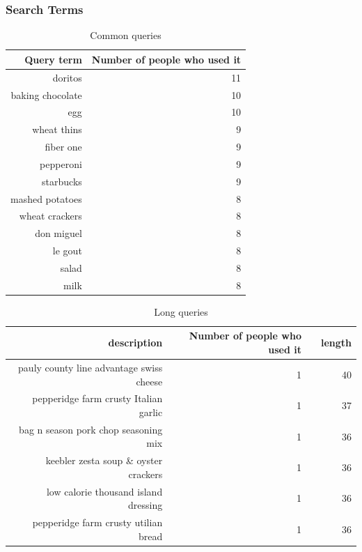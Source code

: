 \subsubsection{Search Terms}
\begin{table}[bthp]
\small
  \centering
  \caption{Common queries}
    \begin{tabular}{rr}
    \toprule
    Query term & Number of people who used it \\
    \midrule
    doritos & 11 \\
    baking chocolate & 10 \\
    egg   & 10 \\
    wheat thins & 9 \\
    fiber one & 9 \\
    pepperoni & 9 \\
    starbucks & 9 \\
    mashed potatoes & 8 \\
    wheat crackers & 8 \\
    don miguel & 8 \\
    le gout & 8 \\
    salad & 8 \\
    milk  & 8 \\
    \bottomrule
    \end{tabular}%
  \label{tab:inlab_commonqueries}%
\end{table}%


\begin{table}[htbp]
\small
  \centering
    \begin{tabular}{rrrr}
    \toprule
    description & Number of people who used it &       & length  \\
    \midrule
    pauly county line advantage swiss cheese & 1     &       & 40 \\
    pepperidge farm crusty Italian garlic & 1     &       & 37 \\
    bag n season pork chop seasoning mix & 1     &       & 36 \\
    keebler zesta soup \& oyster crackers & 1     &       & 36 \\
    low calorie thousand island dressing & 1     &       & 36 \\
    pepperidge farm crusty utilian bread & 1     &       & 36 \\
    \bottomrule
    \end{tabular}%
  \caption{Long queries}
  \label{tab:inlabLongQueries}%
\end{table}%


